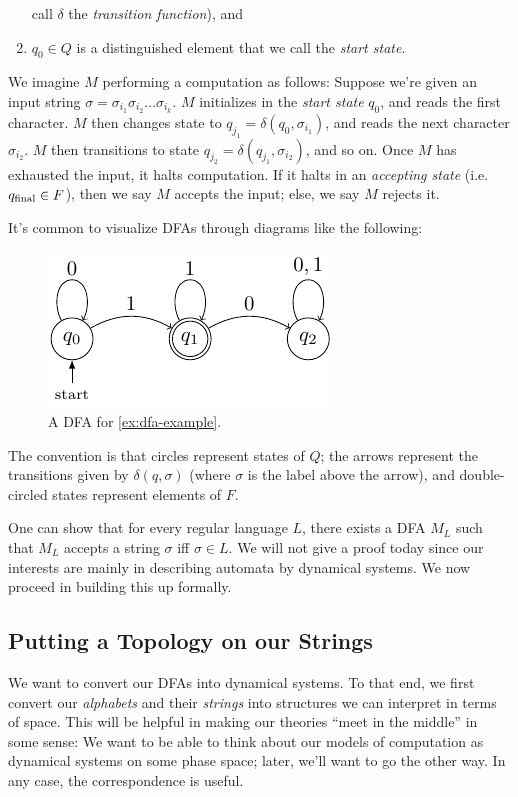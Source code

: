 \documentclass{fkpaper}
\begin{document}
\begin{multicols}{2}
\begin{definition}
\begin{enumerate}
      call $\delta$ the \emph{transition function}), and
    \item $q_0 \in Q$ is a distinguished element that we call the
      \emph{start state}. \qedhere
  \end{enumerate}
\end{definition}
We imagine $M$ performing a computation as follows: Suppose we're
given an input string $\sigma = \sigma_{i_1} \sigma_{i_2} \ldots
\sigma_{i_k}$. $M$ initializes in the \emph{start state} $q_0$, and
reads the first character. $M$ then changes state to $q_{j_1} =
\delta(q_0, \sigma_{i_1})$, and reads the next character
$\sigma_{i_2}$. $M$ then transitions to state $q_{j_2} =
\delta(q_{j_1}, \sigma_{i_2})$, and so on. Once $M$ has exhausted the
input, it halts computation. If it halts in an \emph{accepting state}
(i.e.\ $q_{\rm final} \in F$), then we say $M$ accepts the input;
else, we say $M$ rejects it.

It's common to visualize DFAs through diagrams like the following:
\begin{figure}[H]
  \centering
  \includegraphics[scale=1.2]{figures/dfa-example.pdf}
  \caption{A DFA for \cref{ex:dfa-example}.}
\end{figure}
The convention is that circles represent states of $Q$; the arrows
represent the transitions given by $\delta(q, \sigma)$ (where $\sigma$
is the label above the arrow), and double-circled states represent
elements of $F$.

One can show that for every regular language $L$, there exists a DFA
$M_L$ such that $M_L$ accepts a string $\sigma$ iff $\sigma \in L$. We
will not give a proof today since our interests are mainly in
describing automata by dynamical systems. We now proceed in building
this up formally.

\subsection{Putting a Topology on our Strings}
We want to convert our DFAs into dynamical systems. To that end, we
first convert our \emph{alphabets} and their \emph{strings} into
structures we can interpret in terms of space. {\color{blue} This will
  be helpful in making our theories ``meet in the middle'' in some
  sense: We want to be able to think about our models of computation
  as dynamical systems on some phase space; later, we'll want to go
  the other way. In any case, the correspondence is useful. }


\end{multicols}
\end{document}
